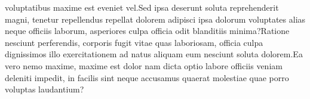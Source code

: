 \documentclass[letterpaper]{article}
\begin{document}
voluptatibus maxime est eveniet vel.Sed ipsa deserunt soluta reprehenderit magni, tenetur repellendus repellat dolorem adipisci ipsa dolorum voluptates alias neque officiis laborum, asperiores culpa officia odit blanditiis minima?Ratione nesciunt perferendis, corporis fugit vitae quas laboriosam, officia culpa dignissimos illo exercitationem ad natus aliquam eum nesciunt soluta dolorem.Ea vero nemo maxime, maxime est dolor nam dicta optio labore officiis veniam deleniti impedit, in facilis sint neque accusamus quaerat molestiae quae porro voluptas laudantium?\clearpage

\end{document}

